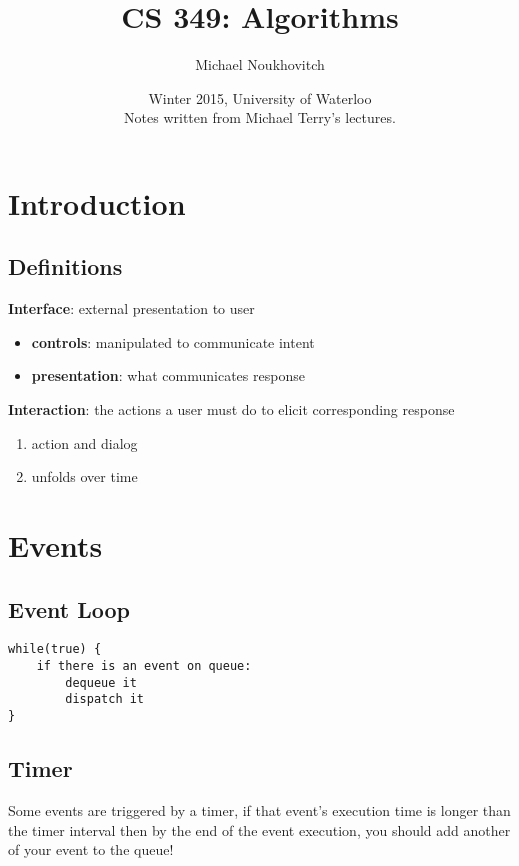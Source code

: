 \documentclass[]{article}
\theoremstyle{definition}
\begin{document}
	\let\ref\Cref

	\title{\bf{CS 349: Algorithms}}
	\date{Winter 2015, University of Waterloo \\ \center Notes written from Michael Terry's lectures.}
	\author{Michael Noukhovitch}

	\maketitle
	\newpage
	\tableofcontents
	\newpage

	\section{Introduction}
		\subsection{Definitions}
			\textbf{Interface}: external presentation to user
			\begin{itemize}
				\item \textbf{controls}: manipulated to communicate intent
				\item \textbf{presentation}: what communicates response
			\end{itemize}
			\textbf{Interaction}: the actions a user must do to elicit corresponding response
			\begin{enumerate}
				\item action and dialog
				\item unfolds over time
			\end{enumerate}
	\section{Events}
		\subsection{Event Loop}
			\begin{lstlisting}
while(true) {
	if there is an event on queue:
		dequeue it 
		dispatch it
}
			\end{lstlisting}
		\subsection{Timer}
			Some events are triggered by a timer, if that event's execution time is longer than the timer interval 
			then by the end of the event execution, you should add another of your event to the queue!
\end{document}
